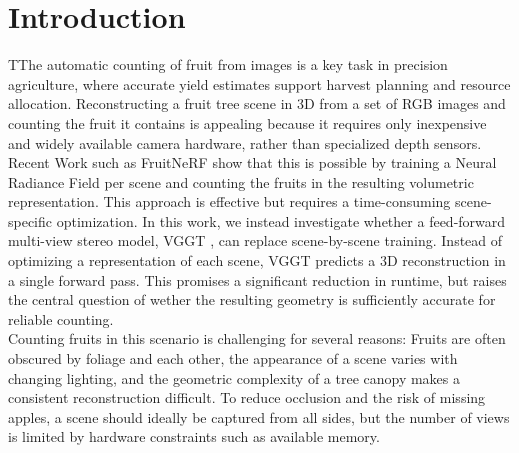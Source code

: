 \documentclass[english, egger, bsc]{vcethesis}
\begin{document}
\chapter{Introduction}
TThe automatic counting of fruit from images is a key task in precision agriculture, where accurate
yield estimates support harvest planning and resource allocation. 
Reconstructing a fruit tree scene in 3D from a set of RGB images and 
counting the fruit it contains is appealing because it requires only inexpensive and widely available camera hardware, rather than specialized depth sensors.
\\Recent Work such as FruitNeRF \cite{meyer2024fruitnerf} show that this is possible by training a Neural Radiance Field \cite{mildenhall2020nerf}
per scene and counting the fruits in the resulting volumetric representation. This approach is effective but requires a time-consuming scene-specific optimization.
In this work, we instead investigate whether a feed-forward multi-view stereo model, VGGT \cite{wang2025vggt}, can replace scene-by-scene training. Instead of optimizing a representation of each scene,
VGGT predicts a 3D reconstruction in a single forward pass. This promises a significant reduction in runtime, but raises the central question of wether the resulting geometry is sufficiently accurate for reliable counting.
\\Counting fruits in this scenario is challenging for several reasons: Fruits are often obscured by foliage and each other, the appearance of a scene varies with changing lighting, and the geometric complexity of a tree canopy 
makes a consistent reconstruction difficult. To reduce occlusion and the risk of missing apples, a scene should ideally be captured from all sides, but the number of views is limited by hardware constraints such as available memory. 
\end{document}
